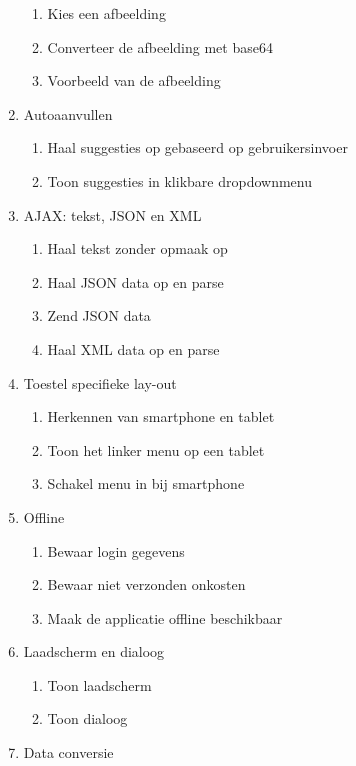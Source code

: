 \begin{enumerate}[label*=U \arabic*.]
\begin{enumerate}[label*=\arabic*]
\item Kies een afbeelding
\item Converteer de afbeelding met base64
\item Voorbeeld van de afbeelding
\end{enumerate}
\item \label{challenge:autoaanvullen}Autoaanvullen
\begin{enumerate}[label*=\arabic*]
\item Haal suggesties op gebaseerd op gebruikersinvoer
\item Toon suggesties in klikbare dropdownmenu
\end{enumerate}
\item \label{challenge:ajax}AJAX: tekst, JSON en XML
\begin{enumerate}[label*=\arabic*]
\item Haal tekst zonder opmaak op
\item Haal JSON data op en parse
\item Zend JSON data
\item Haal XML data op en parse
\end{enumerate}
\item \label{challenge:toestel}Toestel specifieke lay-out
\begin{enumerate}[label*=\arabic*]
\item Herkennen van smartphone en tablet
\item Toon het linker menu op een tablet
\item Schakel menu in bij smartphone
\end{enumerate}
\item \label{challenge:offline}Offline
\begin{enumerate}[label*=\arabic*]
\item Bewaar login gegevens
\item Bewaar niet verzonden onkosten
\item Maak de applicatie offline beschikbaar
\end{enumerate}
\item \label{challenge:laadscherm}Laadscherm en dialoog
\begin{enumerate}[label*=\arabic*]
\item Toon laadscherm
\item Toon dialoog
\end{enumerate}
\item \label{challenge:conversie}Data conversie

\end{enumerate}
